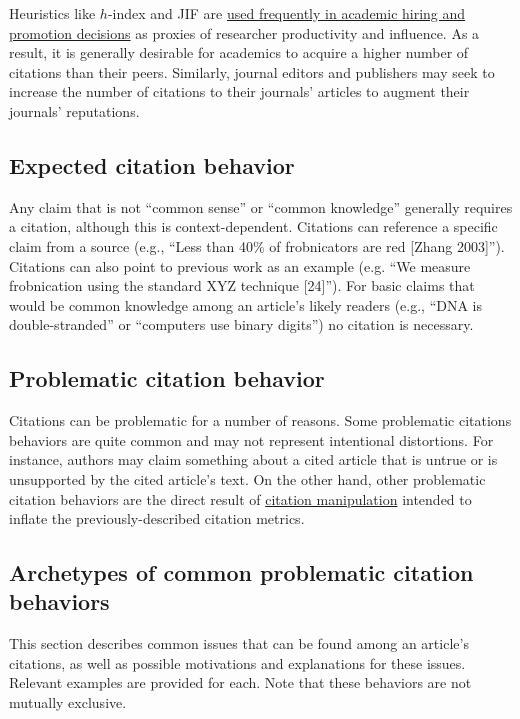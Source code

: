 \documentclass[letterpaper, 12pt]{article}
\begin{document}
Heuristics like $h$-index and JIF are \href{https://doi.org/10.1038/d41586-022-02984-2}{used frequently in academic hiring and promotion decisions} as proxies of researcher productivity and influence. As a result, it is generally desirable for academics to acquire a higher number of citations than their peers. Similarly, journal editors and publishers may seek to increase the number of citations to their journals' articles to augment their journals' reputations.

\subsection*{Expected citation behavior}

Any claim that is not ``common sense'' or ``common knowledge'' generally requires a citation, although this is context-dependent.
Citations can reference a specific claim from a source (e.g., ``Less than 40\% of frobnicators are red [Zhang 2003]''). 
Citations can also point to previous work as an example (e.g. ``We measure frobnication using the standard XYZ technique [24]'').
For basic claims that would be common knowledge among an article's likely readers (e.g., ``DNA is double-stranded'' or ``computers use binary digits'')
no citation is necessary.

\subsection*{Problematic citation behavior}

Citations can be problematic for a number of reasons. Some problematic citations behaviors are quite common and may not represent intentional distortions. For instance, authors may claim something about a cited article that is untrue or is unsupported by the cited article's text. On the other hand, other problematic citation behaviors are the direct result of \href{https://doi.org/10.24318/cope.2019.3.1}{citation manipulation} intended to inflate the previously-described citation metrics.

\subsection*{Archetypes of common problematic citation behaviors}

This section describes common issues that can be found among an article's citations, as well as possible motivations and explanations for these issues. Relevant examples are provided for each. Note that these behaviors are not mutually exclusive.
\end{document}

